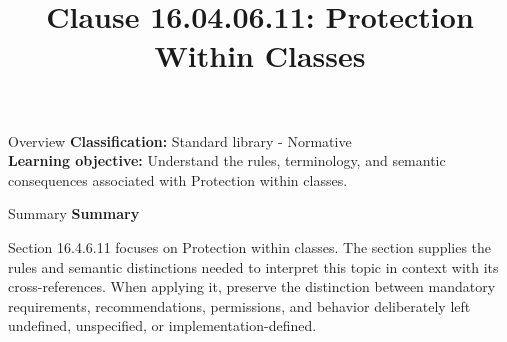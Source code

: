 \documentclass[10pt,letterpaper]{article}
\title{Clause 16.04.06.11: Protection Within Classes}
\author{}
\date{}
\begin{document}
\maketitle
\begin{CornellOverviewBox}{Overview}
\textbf{Classification:} Standard library - Normative\\[2pt]
\textbf{Learning objective:} Understand the rules, terminology, and semantic consequences associated with Protection within classes.
\end{CornellOverviewBox}\begin{CornellSummaryBox}{Summary}
{\sffamily\bfseries\color{Accent} Summary}\par\vspace{3pt}Section 16.4.6.11 focuses on Protection within classes. The section supplies the rules and semantic distinctions needed to interpret this topic in context with its cross-references. When applying it, preserve the distinction between mandatory requirements, recommendations, permissions, and behavior deliberately left undefined, unspecified, or implementation-defined.
\end{CornellSummaryBox}
\end{document}
